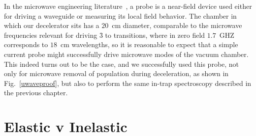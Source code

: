 
In the microwave engineering literature~\cite[Sec.~4.7]{Pozar2009}, a probe is a near-field device used either for driving a waveguide or measuring its local field behavior. 
The chamber in which our decelerator sits has a $20$~cm diameter, comparable to the microwave frequencies relevant for driving \f3 to  transitions, where in zero field $1.7$~GHZ corresponds to $18$~cm wavelengths, so it is reasonable to expect that a simple current probe might successfully drive microwave modes of the vacuum chamber.
This indeed turns out to be the case, and we successfully used this probe, not only for microwave removal of population during deceleration, as shown in Fig.~\ref{uwaveproof}, but also to perform the same in-trap spectroscopy described in the previous chapter.

\section{Elastic v Inelastic}














\ifx\justbeingincluded\undefined

\fi